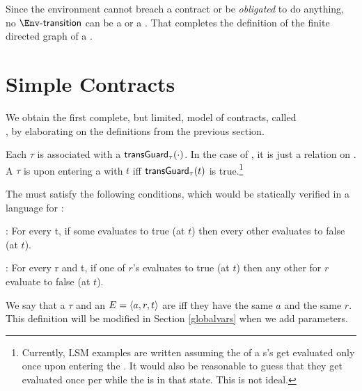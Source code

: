 \documentclass[12pt]{article}
\begin{document}


Since the environment \Env cannot breach a contract or be {\it obligated} to do anything, no $\depTrans{\Env}$ can be a \mustntran or a \rmustntran.
That completes the definition of the finite directed graph \skeleton of a \Contract.




\section{Simple Contracts} \label{sc}

We obtain the first complete, but limited, model of contracts, called \\ , by elaborating on the definitions from the previous section. 


\medskip

Each \transition $\tau$ is associated with a  $\textsf{transGuard}_{\tau}(\cdot)$. In the case of \FSContracts, it is just a relation on \TimeStamps.
A \transition $\tau$ is  upon entering a \GlobalState with \TimeStamp $t$ iff $\textsf{transGuard}_{\tau}(t)$ is true.\footnote{Currently, LSM examples are written assuming the \TGuards of a \State s's \transitions get evaluated only once upon entering the \State. It would also be reasonable to guess that they get evaluated once per \TimeUnit while the \Contract is in that state. This is not ideal.}  

The \TGuards must satisfy the following conditions, which would be statically verified in a language for \FSContracts: 
\medskip

\noindent {}: For every \TimeStamp t, if some \mustntran evaluates to true (at $t$) then every other \TGuard evaluates to false (at $t$). 
\medskip

\noindent {}: For every \Role r and \TimeStamp t, if one of $r$'s \rmustntrans evaluates to true (at $t$) then any other \rmustntrans for $r$ evaluate to false (at $t$).
\medskip

We say that a \transition $\tau$ and an \Event $E = \langle a,r,t\rangle$ are  iff they have the same \Action $a$ and the same \Role $r$. This definition will be modified in Section \ref{globalvars} when we add \Event parameters.
\medskip
\end{document}
